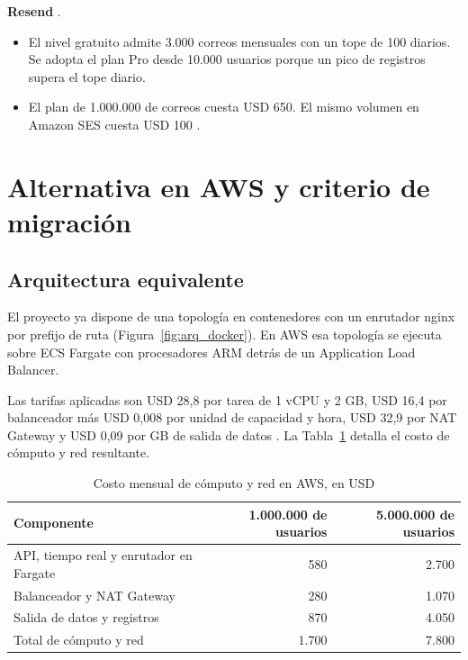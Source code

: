 \textbf{Resend} \cite{resend_pricing}.
\begin{itemize}
  \item El nivel gratuito admite 3.000 correos mensuales con un tope de 100 diarios. Se adopta el plan Pro desde 10.000 usuarios porque un pico de registros supera el tope diario.
  \item El plan de 1.000.000 de correos cuesta USD 650. El mismo volumen en Amazon SES cuesta USD 100 \cite{aws_ses_pricing}.
\end{itemize}

\section{Alternativa en AWS y criterio de migración}
\label{sec:migracion_aws}

\subsection{Arquitectura equivalente}
El proyecto ya dispone de una topología en contenedores con un enrutador nginx por prefijo de ruta (Figura~\ref{fig:arq_docker}). En AWS esa topología se ejecuta sobre ECS Fargate con procesadores ARM detrás de un Application Load Balancer.

Las tarifas aplicadas son USD 28,8 por tarea de 1 vCPU y 2 GB, USD 16,4 por balanceador más USD 0,008 por unidad de capacidad y hora, USD 32,9 por NAT Gateway y USD 0,09 por GB de salida de datos \cite{aws_fargate_pricing, aws_elb_pricing, aws_vpc_pricing}. La Tabla~\ref{tab:costo_aws} detalla el costo de cómputo y red resultante.

\begin{table}[H]
  \centering
  \renewcommand{\arraystretch}{1.2}
  \begin{tabularx}{\textwidth}{X r r}
    \toprule
    Componente & 1.000.000 de usuarios & 5.000.000 de usuarios \\
    \midrule
    API, tiempo real y enrutador en Fargate & 580 & 2.700 \\
    Balanceador y NAT Gateway & 280 & 1.070 \\
    Salida de datos y registros & 870 & 4.050 \\
    \midrule
    Total de cómputo y red & 1.700 & 7.800 \\
    \bottomrule
  \end{tabularx}
  \caption{Costo mensual de cómputo y red en AWS, en USD}
  \label{tab:costo_aws}
\end{table}

